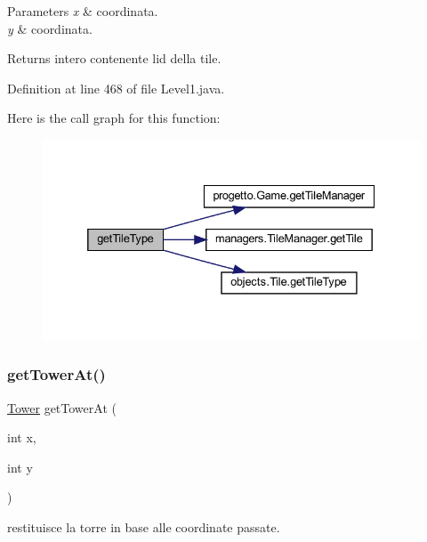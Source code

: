 \begin{DoxyParams}{Parameters}
{\em x} & coordinata. \\
\hline
{\em y} & coordinata.\\
\hline
\end{DoxyParams}
\begin{DoxyReturn}{Returns}
intero contenente l\textquotesingle{}id della tile. 
\end{DoxyReturn}


Definition at line 468 of file Level1.\+java.

Here is the call graph for this function\+:
\nopagebreak
\begin{figure}[H]
\begin{center}
\leavevmode
\includegraphics[width=332pt]{classscenes_1_1_level1_ac689e72523c8460ac3160526d310b1b7_cgraph}
\end{center}
\end{figure}
\mbox{\label{classscenes_1_1_level1_a4345f2e80059788e5ab1dd1cf0ff2c04}} 
\subsubsection{\texorpdfstring{get\+Tower\+At()}{getTowerAt()}}
{\footnotesize\ttfamily \hyperlink{classtowers_1_1_tower}{Tower} get\+Tower\+At (\begin{DoxyParamCaption}\item[{int}]{x,  }\item[{int}]{y }\end{DoxyParamCaption})\hspace{0.3cm}{\ttfamily [private]}}



restituisce la torre in base alle coordinate passate. 


